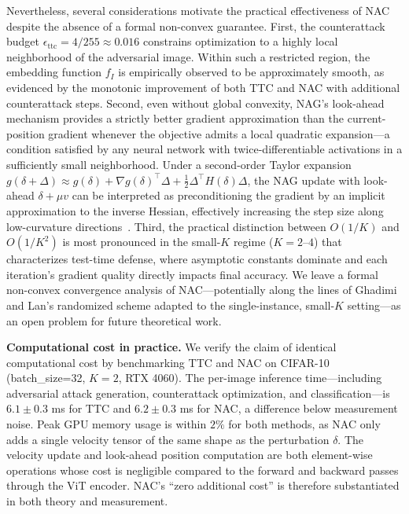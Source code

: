 \documentclass[pdflatex,sn-basic,Numbered]{sn-jnl}
\theoremstyle{thmstyleone}
\theoremstyle{thmstyletwo}
\theoremstyle{thmstylethree}
\begin{document}
Nevertheless, several considerations motivate the practical effectiveness of NAC despite the absence of a formal non-convex guarantee. First, the counterattack budget $\epsilon_{\text{ttc}} = 4/255 \approx 0.016$ constrains optimization to a highly local neighborhood of the adversarial image. Within such a restricted region, the embedding function $f_I$ is empirically observed to be approximately smooth, as evidenced by the monotonic improvement of both TTC and NAC with additional counterattack steps. Second, even without global convexity, NAG's look-ahead mechanism provides a strictly better gradient approximation than the current-position gradient whenever the objective admits a local quadratic expansion---a condition satisfied by any neural network with twice-differentiable activations in a sufficiently small neighborhood. Under a second-order Taylor expansion $g(\delta + \Delta) \approx g(\delta) + \nabla g(\delta)^\top \Delta + \frac{1}{2} \Delta^\top H(\delta) \Delta$, the NAG update with look-ahead $\delta + \mu v$ can be interpreted as preconditioning the gradient by an implicit approximation to the inverse Hessian, effectively increasing the step size along low-curvature directions~\cite{nesterov1983method}. Third, the practical distinction between $O(1/K)$ and $O(1/K^2)$ is most pronounced in the small-$K$ regime ($K=2$--$4$) that characterizes test-time defense, where asymptotic constants dominate and each iteration's gradient quality directly impacts final accuracy. We leave a formal non-convex convergence analysis of NAC---potentially along the lines of Ghadimi and Lan's randomized scheme adapted to the single-instance, small-$K$ setting---as an open problem for future theoretical work.

\textbf{Computational cost in practice.} We verify the claim of identical computational cost by benchmarking TTC and NAC on CIFAR-10 (batch\_size=32, $K=2$, RTX 4060). The per-image inference time---including adversarial attack generation, counterattack optimization, and classification---is $6.1 \pm 0.3$ ms for TTC and $6.2 \pm 0.3$ ms for NAC, a difference below measurement noise. Peak GPU memory usage is within $2\%$ for both methods, as NAC only adds a single velocity tensor of the same shape as the perturbation $\delta$. The velocity update and look-ahead position computation are both element-wise operations whose cost is negligible compared to the forward and backward passes through the ViT encoder. NAC's ``zero additional cost'' is therefore substantiated in both theory and measurement.
\end{document}
